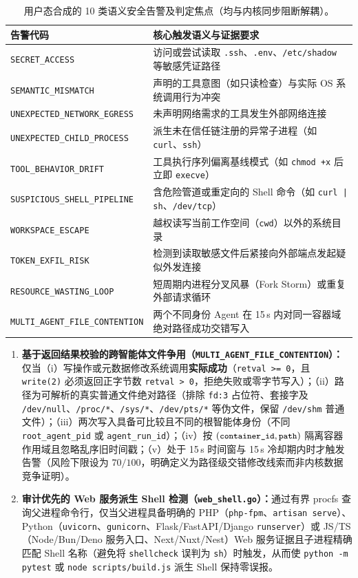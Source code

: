 \documentclass[UTF8,a4paper,zihao=-4,twocolumn]{ctexart}
\newcommand{\code}[1]{\texttt{\small #1}}
\begin{document}
\begin{table}[t]
\centering
\footnotesize
\caption{用户态合成的 10 类语义安全告警及判定焦点（均与内核同步阻断解耦）。}
\label{tab:alerts}
\begin{tabularx}{\columnwidth}{@{}lX@{}}
\toprule
\textbf{告警代码} & \textbf{核心触发语义与证据要求} \\
\midrule
\code{SECRET\_ACCESS} & 访问或尝试读取 \code{.ssh}、\code{.env}、\code{/etc/shadow} 等敏感凭证路径 \\
\code{SEMANTIC\_MISMATCH} & 声明的工具意图（如只读检查）与实际 OS 系统调用行为冲突 \\
\code{UNEXPECTED\_NETWORK\_EGRESS} & 未声明网络需求的工具发生外部网络连接 \\
\code{UNEXPECTED\_CHILD\_PROCESS} & 派生未在信任链注册的异常子进程（如 \code{curl}、\code{ssh}） \\
\code{TOOL\_BEHAVIOR\_DRIFT} & 工具执行序列偏离基线模式（如 \code{chmod +x} 后立即 \code{execve}） \\
\code{SUSPICIOUS\_SHELL\_PIPELINE} & 含危险管道或重定向的 Shell 命令（如 \code{curl | sh}、\code{/dev/tcp}） \\
\code{WORKSPACE\_ESCAPE} & 越权读写当前工作空间（\code{cwd}）以外的系统目录 \\
\code{TOKEN\_EXFIL\_RISK} & 检测到读取敏感文件后紧接向外部端点发起疑似外发连接 \\
\code{RESOURCE\_WASTING\_LOOP} & 短周期内进程分叉风暴（Fork Storm）或重复外部请求循环 \\
\code{MULTI\_AGENT\_FILE\_CONTENTION} & 两个不同身份 Agent 在 15\,s 内对同一容器域绝对路径成功交错写入 \\
\bottomrule
\end{tabularx}
\end{table}

\begin{enumerate}
  \item \textbf{基于返回结果校验的跨智能体文件争用（\code{MULTI\_AGENT\_FILE\_CONTENTION}）：}仅当（i）写操作或元数据修改系统调用\textbf{实际成功}（\code{retval >= 0}，且 \code{write(2)} 必须返回正字节数 \code{retval > 0}，拒绝失败或零字节写入）；（ii）路径为可解析的真实普通文件绝对路径（排除 \code{fd:3} 占位符、套接字及 \code{/dev/null}、\code{/proc/*}、\code{/sys/*}、\code{/dev/pts/*} 等伪文件，保留 \code{/dev/shm} 普通文件）；（iii）两次写入具备可比较且不同的根智能体身份（不同 \code{root\_agent\_pid} 或 \code{agent\_run\_id}）；（iv）按 $(\code{container\_id}, \code{path})$ 隔离容器作用域且忽略乱序旧时间戳；（v）处于 15\,s 时间窗与 15\,s 冷却期内时才触发告警（风险下限设为 $70/100$，明确定义为路径级交错修改线索而非内核数据竞争证明）。
  \item \textbf{审计优先的 Web 服务派生 Shell 检测（\code{web\_shell.go}）：}通过有界 procfs 查询父进程命令行，仅当父进程具备明确的 PHP（\code{php-fpm}、\code{artisan serve}）、Python（\code{uvicorn}、\code{gunicorn}、Flask/FastAPI/Django \code{runserver}）或 JS/TS（Node/Bun/Deno 服务入口、Next/Nuxt/Nest）Web 服务证据且子进程精确匹配 Shell 名称（避免将 \code{shellcheck} 误判为 \code{sh}）时触发，从而使 \code{python -m pytest} 或 \code{node scripts/build.js} 派生 Shell 保持零误报。
\end{enumerate}
\end{document}
